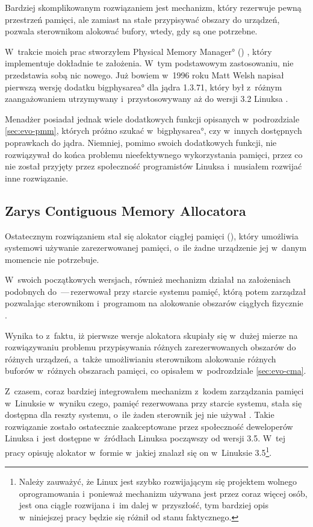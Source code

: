 Bardziej skomplikowanym rozwiązaniem jest mechanizm, który rezerwuje
pewną przestrzeń pamięci, ale zamiast na stałe przypisywać obszary do
urządzeń, pozwala sterownikom alokować bufory, wtedy, gdy są one
potrzebne.

W~trakcie moich prac stworzyłem \ang*{Physical Memory Manager} ()
\autocite{patch:pmm}, który implementuje dokładnie te założenia. W~tym
podstawowym zastosowaniu,  nie przedstawia sobą nic nowego.  Już
bowiem w~1996 roku Matt Welsh napisał pierwszą wersję dodatku
\ang*{bigphysarea} dla jądra 1.3.71, który był z~różnym zaangażowaniem
utrzymywany i~przystosowywany aż do wersji 3.2 Linuksa
\autocite{patch:bigphys}.

Menadżer  posiadał jednak wiele dodatkowych funkcji opisanych
w~podrozdziale \ref{sec:evo-pmm}, których próżno szukać
w~\ang*{bigphysarea}, czy w~innych dostępnych poprawkach do jądra.
Niemniej, pomimo swoich dodatkowych funkcji, nie rozwiązywał do końca
problemu nieefektywnego wykorzystania pamięci, przez co nie został
przyjęty przez społeczność programistów Linuksa i~musiałem rozwijać
inne rozwiązanie.

\subsection{Zarys Contiguous Memory Allocatora}

Ostatecznym rozwiązaniem stał się alokator ciągłej pamięci (),
który umożliwia systemowi używanie zarezerwowanej pamięci, o~ile żadne
urządzenie jej w~danym momencie nie potrzebuje.

W~swoich początkowych wersjach, również mechanizm  działał na
założeniach podobnych do \,---\,rezerwował przy starcie systemu
pamięć, którą potem zarządzał pozwalając sterownikom i~programom na
alokowanie obszarów ciągłych fizycznie \autocite{patch:cma-1}.

Wynika to z~faktu, iż pierwsze wersje alokatora  skupiały się
w~dużej mierze na rozwiązywaniu problemu przypisywania różnych
zarezerwowanych obszarów do różnych urządzeń, a~także umożliwianiu
sterownikom alokowanie różnych buforów w~różnych obszarach pamięci, co
opisałem w~podrozdziale \ref{sec:evo-cma}.

Z~czasem, coraz bardziej integrowałem mechanizm  z~kodem
zarządzania pamięci w~Linuksie w~wyniku czego, pamięć rezerwowana przy
starcie systemu, stała się dostępna dla reszty systemu, o~ile żaden
sterownik jej nie używał \autocite{patch:cma-24}.  Takie rozwiązanie
zostało ostatecznie zaakceptowane przez społeczność deweloperów
Linuksa i~jest dostępne w~źródłach Linuksa począwszy od wersji 3.5.
W~tej pracy opisuję alokator  w~formie w~jakiej znalazł się on
w~Linuksie 3.5\footnote{Należy zauważyć, że Linux jest szybko
  rozwijającym się projektem wolnego oprogramowania i~ponieważ
  mechanizm  używana jest przez coraz więcej osób, jest ona ciągle
  rozwijana i~im dalej w~przyszłość, tym bardziej opis w~niniejszej
  pracy będzie się różnił od stanu faktycznego.}.


